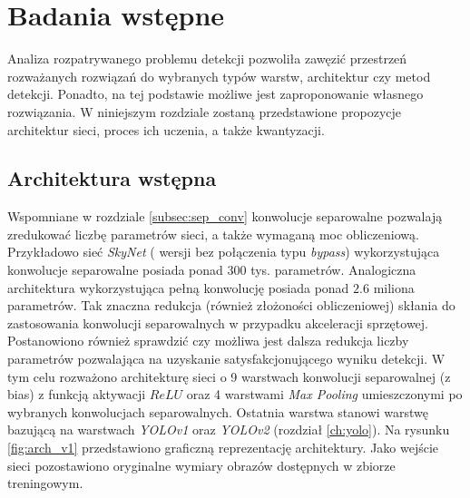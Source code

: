 \chapter{Badania wstępne}
\label{cha:Badania wstępne}

Analiza rozpatrywanego problemu detekcji pozwoliła zawęzić przestrzeń rozważanych rozwiązań do wybranych typów warstw, architektur czy metod detekcji. 
Ponadto, na tej podstawie możliwe jest zaproponowanie własnego rozwiązania.
W niniejszym rozdziale zostaną przedstawione propozycje architektur sieci, proces ich uczenia, a także kwantyzacji. 

\section{Architektura wstępna}

Wspomniane w rozdziale \ref{subsec:sep_conv} konwolucje separowalne pozwalają zredukować liczbę parametrów sieci, a także wymaganą moc obliczeniową.
Przykładowo sieć \emph{SkyNet} ( wersji bez połączenia typu \emph{bypass}) wykorzystująca konwolucje separowalne posiada ponad $300$ tys. parametrów. 
Analogiczna architektura wykorzystująca pełną konwolucję posiada ponad $2.6$ miliona parametrów.
Tak znaczna redukcja (również złożoności obliczeniowej) skłania do zastosowania konwolucji separowalnych w przypadku akceleracji sprzętowej. 
Postanowiono również sprawdzić czy możliwa jest dalsza redukcja liczby parametrów pozwalająca na uzyskanie satysfakcjonującego wyniku detekcji.  
W tym celu rozważono architekturę sieci o 9 warstwach konwolucji separowalnej (z bias) z funkcją aktywacji $ReLU$ oraz  4 warstwami \emph{Max Pooling} umieszczonymi po wybranych konwolucjach separowalnych.
Ostatnia warstwa stanowi warstwę bazującą na warstwach \emph{YOLOv1} oraz \emph{YOLOv2} (rozdział \ref{ch:yolo}). 
Na rysunku \ref{fig:arch_v1} przedstawiono graficzną reprezentację architektury. 
Jako wejście sieci pozostawiono oryginalne wymiary obrazów dostępnych w zbiorze treningowym.

